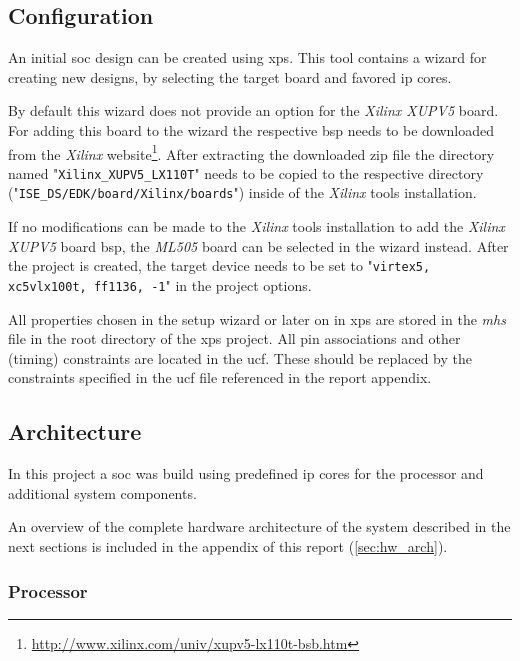 \subsection{Configuration}

An initial \gls{soc} design can be created using \gls{xps}. This tool contains a wizard for creating new designs, by selecting the target board and favored \gls{ip} cores. 

By default this wizard does not provide an option for the \textit{Xilinx XUPV5} board. For adding this board to the wizard the respective \gls{bsp} needs to be downloaded from the \textit{Xilinx} website\footnote{\url{http://www.xilinx.com/univ/xupv5-lx110t-bsb.htm}}. After extracting the downloaded zip file the directory named "\texttt{Xilinx\_XUPV5\_LX110T}" needs to be copied to the respective directory ("\texttt{ISE\_DS/EDK/board/Xilinx/boards}") inside of the \textit{Xilinx} tools installation.

If no modifications can be made to the \textit{Xilinx} tools installation to add the \textit{Xilinx XUPV5} board \gls{bsp}, the \textit{ML505} board can be selected in the wizard instead. After the project is created, the target device needs to be set to "\texttt{virtex5, xc5vlx100t, ff1136, -1}" in the project options.

All properties chosen in the setup wizard or later on in \gls{xps} are stored in the \textit{\gls{mhs}} file in the root directory of the \gls{xps} project. All pin associations and other (timing) constraints are located in the \gls{ucf}. These should be replaced by the constraints specified in the \gls{ucf} file referenced in the report appendix.

\subsection{Architecture}

In this project a \gls{soc} was build using predefined \gls{ip} cores for the processor and additional system components.

An overview of the complete hardware architecture of the system described in the next sections is included in the appendix of this report (\ref{sec:hw_arch}).

\subsubsection{Processor}
\label{subsubsec:microblaze}

